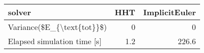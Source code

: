 \begin{tabular}{lrr}
\hline
 solver                      &   HHT &   ImplicitEuler \\
\hline
 Variance(\$E\_\{\textbackslash{}text\{tot\}\}\$)  &   0   &             0   \\
 Elapsed simulation time [s] &   1.2 &           226.6 \\
\hline
\end{tabular}